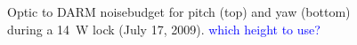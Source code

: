 \begin{figure}
\begin{centering}
\caption[]{Optic to DARM noisebudget for pitch (top) and
  yaw (bottom) during a 14~W lock (July 17,
  2009). \textcolor{blue}{which height to use?}}
\label{fig:}
\end{centering}
\end{figure}

